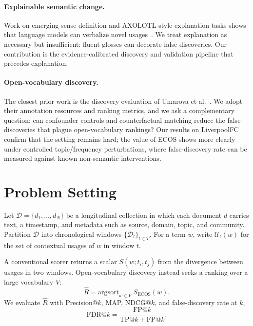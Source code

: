 \documentclass[journal]{IEEEtran}
\begin{document}
\paragraph{Explainable semantic change.}
Work on emerging-sense definition and AXOLOTL-style explanation tasks shows that language models can verbalize novel usages~\cite{axolotl2024}.
We treat explanation as necessary but insufficient: fluent glosses can decorate false discoveries.
Our contribution is the evidence-calibrated discovery and validation pipeline that precedes explanation.

\paragraph{Open-vocabulary discovery.}
The closest prior work is the discovery evaluation of Umarova et al.~\cite{umarova2025discovery}.
We adopt their annotation resources and ranking metrics, and we ask a complementary question: can confounder controls and counterfactual matching reduce the false discoveries that plague open-vocabulary rankings?
Our results on LiverpoolFC confirm that the setting remains hard; the value of ECOS shows more clearly under controlled topic/frequency perturbations, where false-discovery rate can be measured against known non-semantic interventions.

\section{Problem Setting}
\label{sec:problem}

Let $\mathcal{D}=\{d_1,\ldots,d_N\}$ be a longitudinal collection in which each document $d$ carries text, a timestamp, and metadata such as source, domain, topic, and community.
Partition $\mathcal{D}$ into chronological windows $\{ \mathcal{D}_t \}_{t\in T}$.
For a term $w$, write $\mathcal{U}_t(w)$ for the set of contextual usages of $w$ in window $t$.

A conventional scorer returns a scalar $S(w;t_i,t_j)$ from the divergence between usages in two windows.
Open-vocabulary discovery instead seeks a ranking over a large vocabulary $V$:
\begin{equation}
\hat{R} = \mathrm{argsort}_{w\in V} \; S_{\mathrm{ECOS}}(w).
\end{equation}
We evaluate $\hat{R}$ with Precision@$k$, MAP, NDCG@$k$, and false-discovery rate at $k$,
\begin{equation}
\mathrm{FDR}@k = \frac{\mathrm{FP}@k}{\mathrm{TP}@k+\mathrm{FP}@k}.
\end{equation}
\end{document}
